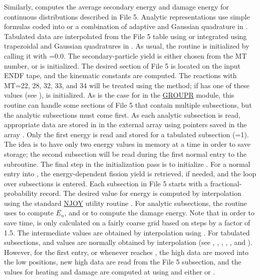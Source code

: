 Similarly,  computes
the average secondary energy and damage energy for continuous
distributions described in File 5.  Analytic representations use
simple formulas coded into 
or a combination of adaptive and Gaussian quadrature in
.  Tabulated data are
interpolated from the File 5 table using
 or integrated using
trapezoidal and Gaussian quadratures in
.  As usual, the routine
is initialized by calling it with =0.0.  The
secondary-particle yield is either chosen from the MT number,
or  is initialized.  The
desired section of File 5 is located on the input ENDF tape, and the
kinematic constants are computed.  The reactions
with MT=22, 28, 32, 33, and 34 will be treated using the
 method; if
 has one of these values (see ),
 is initialized.  As is the case for
 in the
\hyperlink{sGROUPRhy}{GROUPR}
module, this routine can handle some sections of File 5 that contain
multiple subsections, but the analytic subsections must come
first.  As each analytic subsection is read, appropriate data
are stored in in the external array  using pointers
saved in the array .  Only the first energy is read
and stored for a tabulated subsection (=1).  The
idea is to have only two energy values in memory at a time
in order to save storage; the second subsection will be read
during the first normal entry to the subroutine.  The final
step in the initialization pass is to initialize
.  For a normal entry into
, the energy-dependent
fission yield is retrieved, if needed, and the loop over
subsections is entered.  Each subsection in File 5 starts
with a fractional-probability record.  The desired value
for energy  is computed by interpolation using the
standard \hyperlink{sNJOYhy}{NJOY} utility routine
.
For analytic subsections, the routine uses
 to compute
$\overline{E_n}$, and  or
 to
compute the damage energy. Note that in order to save time,
 is only calculated on a fairly coarse grid
based on steps by a factor of 1.5.  The intermediate values
are obtained by interpolation using
.  For
tabulated subsections,  and  values
are normally obtained by interpolation (see ,
, , , , and
).  However, for the first entry, or whenever
 reaches , the high data are moved into
the low positions, new high data are read from the File 5
subsection, and the values for heating and damage
are computed at  using
 and
either  or
.

